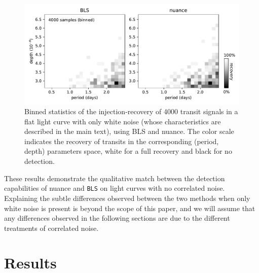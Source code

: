 \documentclass[modern]{aastex631}
\begin{document}
\begin{figure}[H]
    \begin{centering}
        \includegraphics[width=\linewidth]{../workflows/control_test_bls/figures/control_test.pdf}
        \caption{Binned statistics of the injection-recovery of 4000 transit signals in a flat light curve with only white noise (whose characteristics are described in the main text), using \textsf{BLS} and \textsf{nuance}. The color scale indicates the recovery of transits in the corresponding (period, depth) parameters space, white for a full recovery and black for no detection.}
        \label{fig:control}
    \end{centering}
\end{figure}

These results demonstrate the qualitative match between the detection capabilities of \textsf{nuance} and \texttt{BLS} on light curves with no correlated noise. Explaining the subtle differences observed between the two methods when only white noise is present is beyond the scope of this paper, and we will assume that any differences observed in the following sections are due to the different treatments of correlated noise.

\newpage
\section{Results}\label{results}
\end{document}
